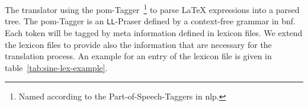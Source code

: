 The translator using the \gls*{pom}-Tagger~\parencite{POM-Tagger}\footnote{Named according to the Part-of-Speech-Taggers in \gls*{nlp}.} to parse \LaTeX{} expressions into a parsed tree. The \gls*{pom}-Tagger is an \texttt{LL}-Praser defined by a context-free grammar in \gls*{bnf}. Each token will be tagged by meta information defined in lexicon files. We extend the lexicon files to provide also the information that are necessary for the translation process. An example for an entry of the lexicon file is given in table~\ref{tab:sine-lex-example}.




